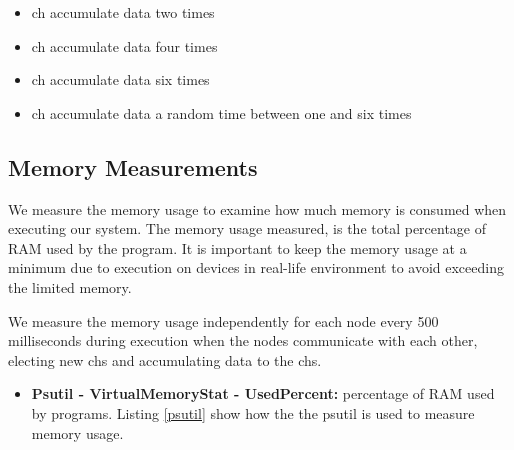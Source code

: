 \documentclass[USenglish]{uit-thesis}
\begin{document}
\begin{itemize}
\item \gls{ch} accumulate data two times
\item \gls{ch} accumulate data four times
\item \gls{ch} accumulate data six times
\item \gls{ch} accumulate data a random time between one and six times
\end{itemize}



\subsection{Memory Measurements} \label{eva:mem_measure}
We measure the memory usage to examine how much memory is consumed when executing our system. The memory usage measured, is the total percentage of RAM used by the program. It is important to keep the memory usage at a minimum due to execution on devices in real-life environment to avoid exceeding the limited memory.


We measure the memory usage independently for each node every 500 milliseconds during execution when the nodes communicate with each other, electing new \glspl{ch} and accumulating data to the \glspl{ch}.



\begin{itemize}
\item \textbf{Psutil - VirtualMemoryStat - UsedPercent:} percentage of RAM used by programs. Listing \ref{psutil} show how the the psutil is used to measure memory usage.
\end{itemize}

\newpage
\end{document}
